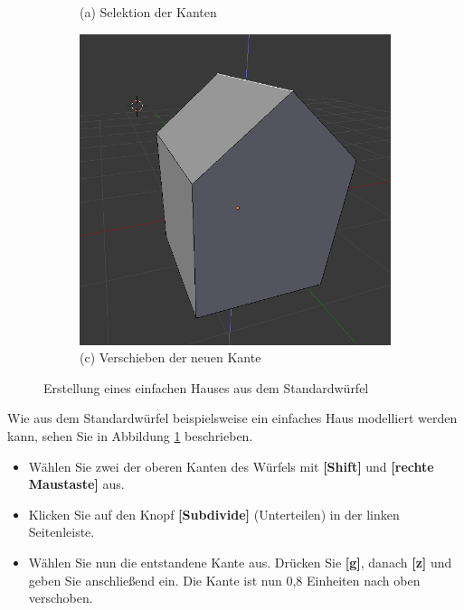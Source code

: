 \documentclass[10pt,a5paper,twoside,titlepage]{scrartcl}
\begin{document}
\begin{figure}
\begin{minipage}[h]{.5\textwidth}
\begin{subfigure}{\textwidth}
    			\caption{(a) Selektion der Kanten}
    		\end{subfigure}
    
    		\begin{subfigure}[b]{\textwidth}
    			\centering
    			\includegraphics[width=\textwidth]{blender_house.png}
    			\caption{(c) Verschieben der neuen Kante}
    		\end{subfigure}
    \end{minipage}
    \caption{Erstellung eines einfachen Hauses aus dem Standardwürfel}
    \label{fig:blender_house}
	\end{figure}
	Wie aus dem Standardwürfel beispielsweise ein einfaches Haus modelliert werden kann, sehen Sie in Abbildung \ref{fig:blender_house} beschrieben.
	\begin{itemize}
	\item Wählen Sie zwei der oberen Kanten des Würfels mit \textbf{[Shift]} und \textbf{[rechte Maustaste]} aus. 
	\item Klicken Sie auf den Knopf \textbf{[Subdivide]} (Unterteilen) in der linken Seitenleiste.
	\item Wählen Sie nun die entstandene Kante aus. Drücken Sie \textbf{[g]}, danach \textbf{[z]} und geben Sie anschließend \dq ein. Die Kante ist nun 0,8 Einheiten nach oben verschoben.
	\end{itemize}
\end{document}
